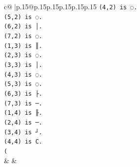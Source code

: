 \documentclass{article}
\begin{document}
{\begin{supertabular}{c@{$\;$}|p{.15\linewidth}@{}p{.15\linewidth}p{.15\linewidth}p{.15\linewidth}p{.15\linewidth}p{.15\linewidth}}
{{{\texttt{(4,2) is ◌.} \\
\texttt{(5,2) is ◌.} \\
\texttt{(6,2) is │.} \\
\texttt{(7,2) is ◌.} \\
\texttt{(1,3) is ║.} \\
\texttt{(2,3) is ◌.} \\
\texttt{(3,3) is │.} \\
\texttt{(4,3) is ◌.} \\
\texttt{(5,3) is ◌.} \\
\texttt{(6,3) is ├.} \\
\texttt{(7,3) is ─.} \\
\texttt{(1,4) is ╟.} \\
\texttt{(2,4) is ─.} \\
\texttt{(3,4) is ┘.} \\
\texttt{(4,4) is C.} \\
\texttt{(} \\
            }
        }
    }
    & & \\ \\


\end{supertabular}}
\end{document}
